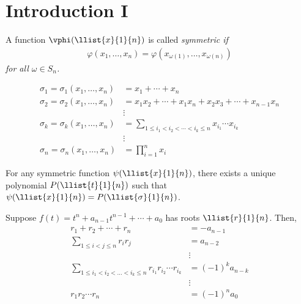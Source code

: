 \documentclass[a4paper]{article}
\begin{document}
\section{Introduction I}
\begin{tdefinition}
  A function \( \vphi(\llist{x}{1}{n}) \) is called \it{symmetric} if \begin{align*}
    \varphi(x_1,\ldots,x_n) = \varphi(x_{\omega(1)},\ldots,x_{\omega(n)})
  \end{align*}
  for all \( \omega\in S_n \).
\end{tdefinition}

\begin{tdefinition}
  \begin{align*}
    \sigma_1 = \sigma_1(x_1,\ldots,x_n) &= x_1+\cdots+x_n \\
    \sigma_2 = \sigma_2(x_1,\ldots,x_n) &= x_1x_2+\cdots+x_1x_n+x_2x_3+\cdots+x_{n-1}x_n \\
    &\vdots \\
    \sigma_k = \sigma_k(x_1,\ldots,x_n)&=\sum\limits_{1\leq i_1<i_2<\cdots<i_k\leq n}x_{i_1}\cdots x_{i_k} \\
    &\vdots \\
    \sigma_n = \sigma_n(x_1,\ldots,x_n)&=\prod\limits_{i=1}^n x_i
  \end{align*}
\end{tdefinition}

\begin{ttheorem}
  For any symmetric function \( \psi(\llist{x}{1}{n}) \), there exists a unique polynomial \( P(\llist{t}{1}{n}) \) such that \( \psi(\llist{x}{1}{n}) = P(\llist{\sigma}{1}{n}) \).
\end{ttheorem}

\begin{tdefinition}
Suppose \( f(t) = t^{n} + a_{n-1} t^{n-1} + \cdots + a_{0} \) has roots \( \llist{r}{1}{n} \).
Then,
  \begin{align*}
  r_1 + r_2 + \cdots + r_n &= -a_{n-1} \\
  \sum_{1 \le i < j \le n} r_i r_j &= a_{n-2} \\
  &\vdots \\
  \sum_{1 \le i_1 < i_2 < \dots < i_k \le n} r_{i_{1}}r_{i_{2}}\cdots r_{i_{k}} &= (-1)^k a_{n-k} \\
  &\vdots \\
  r_1 r_2 \cdots r_n &= (-1)^n a_0
  \end{align*}
\end{tdefinition}
\end{document}
